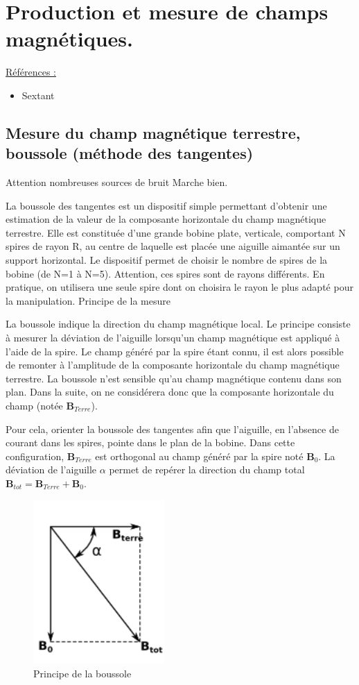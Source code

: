 \documentclass{article}%
\begin{document}
\section{Production et mesure de champs magnétiques.}
\underline{Références :}
\begin{itemize}
	\item Sextant
\end{itemize}
\subsection{Mesure du champ magnétique terrestre, boussole (méthode des tangentes)}
Attention nombreuses sources de bruit
Marche bien.

La boussole des tangentes est un dispositif simple permettant d'obtenir une estimation de la valeur de la composante horizontale du champ magnétique terrestre. Elle est constituée d'une grande bobine plate, verticale, comportant N spires de rayon R, au centre de laquelle est placée une aiguille aimantée sur un support horizontal. Le dispositif permet de choisir le nombre de spires de la bobine (de N=1 à N=5). Attention, ces spires sont de rayons différents. En pratique, on utilisera une seule spire dont on choisira le rayon le plus adapté pour la manipulation.
Principe de la mesure

La boussole indique la direction du champ magnétique local. Le principe consiste à mesurer la déviation de l'aiguille lorsqu'un champ magnétique est appliqué à l'aide de la spire. Le champ généré par la spire étant connu, il est alors possible de remonter à l'amplitude de la composante horizontale du champ magnétique terrestre. La boussole n'est sensible qu'au champ magnétique contenu dans son plan. Dans la suite, on ne considérera donc que la composante horizontale du champ (notée $\mathbf{B}_{Terre}$).

Pour cela, orienter la boussole des tangentes afin que l'aiguille, en l'absence de courant dans les spires, pointe dans le plan de la bobine. Dans cette configuration, $\mathbf{B}_{Terre}$ est orthogonal au champ généré par la spire noté $\mathbf{B}_{0}$. La déviation de l'aiguille $\alpha$ permet de repérer la direction du champ total $\mathbf{B}_{tot}=\mathbf{B}_{Terre}+\mathbf{B}_{0}$.
\begin{figure}
	\centerline{\includegraphics[width=5cm]{images-exp/Boussole_tangente.png}}
	\caption{Principe de la boussole}
\end{figure}
\end{document}
